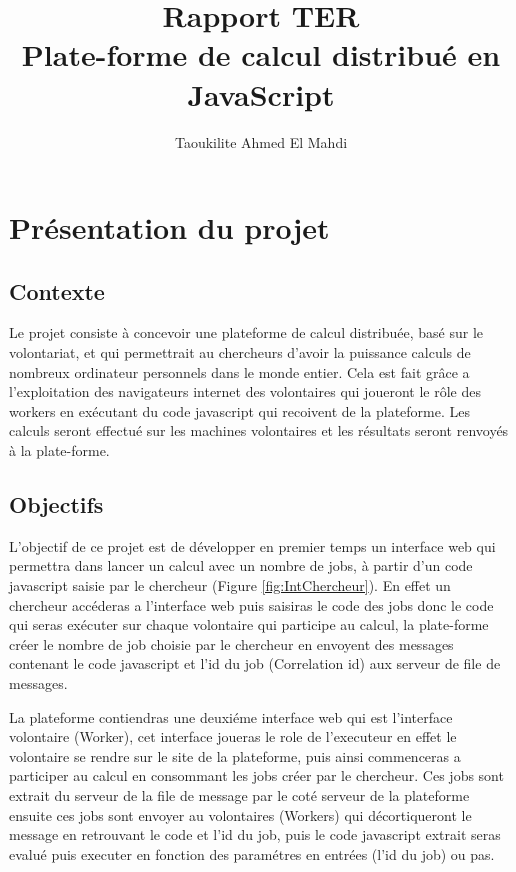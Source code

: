 \documentclass[a4paper]{article}
\title{Rapport TER\\ Plate-forme de calcul distribué en JavaScript}
\author{Taoukilite Ahmed El Mahdi}
\begin{document}
\maketitle

\section{Présentation du projet}
\subsection{Contexte}
Le projet consiste à concevoir une plateforme de calcul distribuée, basé sur le volontariat, et qui permettrait au chercheurs d'avoir la puissance calculs de nombreux ordinateur personnels dans le monde entier. Cela est fait grâce a l'exploitation des navigateurs internet des volontaires qui joueront le rôle des workers en exécutant du code javascript qui recoivent de la plateforme. Les calculs seront effectué sur les machines volontaires et les résultats seront renvoyés à la plate-forme.

\subsection{Objectifs}

L'objectif de ce projet est de développer en premier temps un interface web qui permettra dans lancer un calcul avec un nombre de jobs, à partir d'un code javascript saisie par le chercheur (Figure \ref{fig:IntChercheur}). En effet un chercheur accéderas a l'interface web  puis saisiras le code des jobs donc le code qui seras exécuter sur chaque volontaire qui participe au calcul, la plate-forme créer le nombre de job choisie par le chercheur en envoyent des messages contenant le code javascript et l'id du job (Correlation id) aux serveur de file de messages.

La plateforme contiendras une deuxiéme interface web qui est l'interface volontaire (Worker), cet interface joueras le role de l'executeur en effet le volontaire se rendre sur le site de la plateforme, puis ainsi commenceras a participer au calcul en consommant les jobs créer par le chercheur. Ces jobs sont extrait du serveur de la file de message par le coté serveur de la plateforme ensuite ces jobs sont envoyer au volontaires (Workers) qui décortiqueront le message en retrouvant le code et l'id du job, puis le code javascript extrait seras evalué puis executer en fonction des paramétres en entrées (l'id du job) ou pas.
\end{document}

